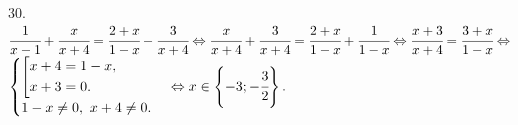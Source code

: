 30. $\cfrac{1}{x-1}+\cfrac{x}{x+4}=\cfrac{2+x}{1-x}-\cfrac{3}{x+4}\Leftrightarrow \cfrac{x}{x+4}+\cfrac{3}{x+4}=\cfrac{2+x}{1-x}+\cfrac{1}{1-x}
\Leftrightarrow \cfrac{x+3}{x+4}=\cfrac{3+x}{1-x}\Leftrightarrow$\\$ \begin{cases}
\left[
      \begin{gathered} x+4=1-x,\hfill\\
      x+3=0.\hfill \end{gathered}\right.\\
1-x\neq0,\ x+4\neq0.\end{cases}\Leftrightarrow x\in\left\{-3;-\cfrac{3}{2}\right\}.$\\
